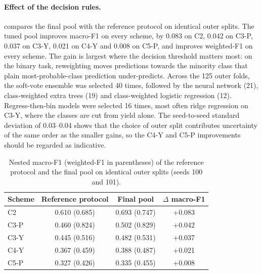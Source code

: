 \documentclass[10pt,a4paper]{article}
\begin{document}
\paragraph{Effect of the decision rules.}  compares the
final pool with the reference protocol on identical outer splits. The tuned
pool improves macro-F1 on every scheme, by 0.083 on C2, 0.042 on C3-P, 0.037
on C3-Y, 0.021 on C4-Y and 0.008 on C5-P, and improves weighted-F1 on every
scheme. The gain is largest where the decision threshold matters most: on the
binary task, reweighting moves predictions towards the minority class that
plain most-probable-class prediction under-predicts. Across the 125 outer
folds, the soft-vote ensemble was selected 40 times, followed by the neural
network (21), class-weighted extra trees (19) and class-weighted logistic
regression (12). Regress-then-bin models were selected 16 times, most often
ridge regression on C3-Y, where the classes are cut from yield alone. The seed-to-seed standard deviation of 0.03--0.04 shows
that the choice of outer split contributes uncertainty of the same order as
the smaller gains, so the C4-Y and C5-P improvements should be regarded as
indicative.

\begin{table}[t]
\centering
\caption{Nested macro-F1 (weighted-F1 in parentheses) of the reference protocol
and the final pool on identical outer splits (seeds 100 and 101).}
\label{tab:improvement}
\small
\begin{tabular}{lccc}
\toprule
Scheme & Reference protocol & Final pool & $\Delta$ macro-F1 \\
\midrule
C2   & 0.610 (0.685) & 0.693 (0.747) & +0.083 \\
C3-P & 0.460 (0.824) & 0.502 (0.829) & +0.042 \\
C3-Y & 0.445 (0.516) & 0.482 (0.531) & +0.037 \\
C4-Y & 0.367 (0.459) & 0.388 (0.487) & +0.021 \\
C5-P & 0.327 (0.426) & 0.335 (0.455) & +0.008 \\
\bottomrule
\end{tabular}
\end{table}
\end{document}
